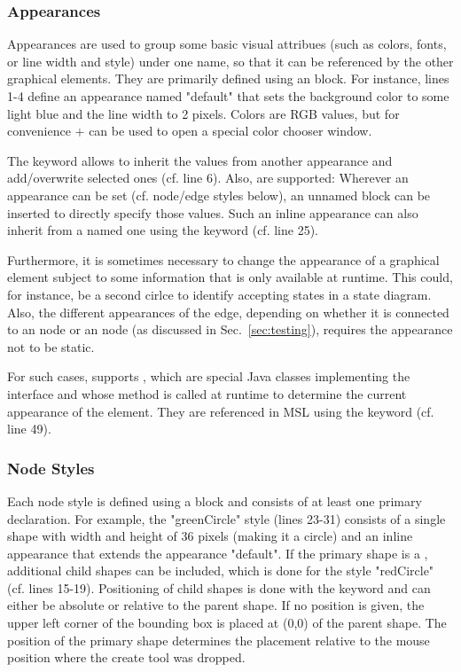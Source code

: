 \documentclass[a4paper,american,12pt]{scrreprt}
\begin{document}
\subsubsection{Appearances}

Appearances are used to group some basic visual attribues (such as colors,
fonts, or line width and style) under one name, so that it can be referenced by
the other graphical elements. They are primarily defined using an
  block. For instance, lines 1-4 define an
appearance named "default" that sets the background color to some light blue and
the line width to 2 pixels. Colors are RGB values, but for convenience
+ can be used to open a special color chooser
window.

The keyword  allows to inherit the values from another appearance
and add/overwrite selected ones (cf. line 6). Also,  are supported: Wherever an appearance can be set (cf.
node/edge styles below), an unnamed  block can be inserted to
directly specify those values. Such an inline appearance can also inherit from
a named one using the keyword  (cf. line 25).

Furthermore, it is sometimes necessary to change the appearance of a graphical
element subject to some information that is only available at runtime. This
could, for instance, be a second cirlce to identify accepting states in a state
diagram. Also, the different appearances of the  edge, depending
on whether it is connected to an  node or an  node (as
discussed in Sec.~\ref{sec:testing}), requires the appearance not to be static. 

For such cases, \cinco{} supports ,
which are special Java classes implementing the 
interface and whose  method is called at runtime to
determine the current appearance of the element. They are referenced in MSL using
the  keyword (cf. line 49).

\FloatBarrier

\subsubsection{Node Styles}

Each node style is defined using a   block and
consists of at least one primary  declaration. For example,
the "greenCircle" style (lines 23-31) consists of a single  shape
with width and height of 36 pixels (making it a circle) and an inline
appearance that extends the appearance "default". If the primary shape is a
, additional child shapes can be included, which is
done for the style "redCircle" (cf. lines 15-19). Positioning of child shapes
is done with the keyword  and can either be absolute or relative
to the parent shape. If no position is given, the upper left corner of the
bounding box is placed at (0,0) of the parent shape.  The position of the
primary shape determines the placement relative to the mouse position where the
create tool was dropped.
\end{document}
